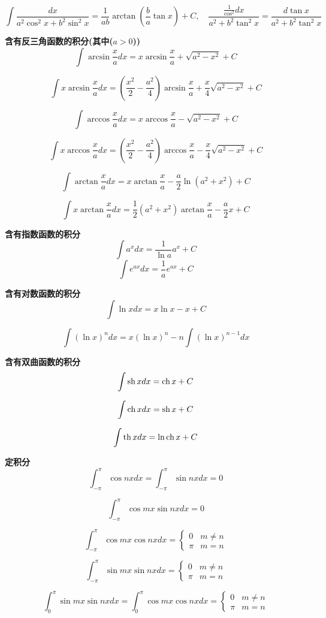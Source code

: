 \documentclass{book}
\begin{document}
$$
\int \frac{ dx}{a^2 \cos^2 x+b^2\sin^2 x}=\frac{ 1}{ab} \arctan(\frac{b}{a}\tan x)+C, \quad
\frac{\frac{1}{\cos^2}dx}{a^2+b^2\tan^2 x}=\frac{d \tan x}{a^2 + b^2 \tan^2 x}
$$

\textbf{含有反三角函数的积分(其中($a>0$))}
$$ \int \arcsin \frac{x}{a}dx=x\arcsin \frac{x}{a}+\sqrt{a^2-x^2}+C $$

$$ \int x\arcsin \frac{x}{a}dx=(\frac{x^2}{2}-\frac{ a^2}{4})\arcsin \frac{x}{a}+ \frac{x}{4}\sqrt{a^2-x^2}+C $$

$$ \int \arccos \frac{x}{a}dx=x \arccos \frac{x}{a}-\sqrt{a^2-x^2}+C $$

$$ \int x\arccos \frac{x}{a}dx=(\frac{x^2}{2}-\frac{ a^2}{4})\arccos \frac{x}{a}- \frac{x}{4}\sqrt{a^2-x^2}+C $$

$$ \int \arctan \frac{x}{a}dx=x \arctan \frac{x}{a}-\frac{a}{2}\ln(a^2+x^2)+C $$

$$ \int x \arctan \frac{x}{a}dx=\frac{1}{2}(a^2+x^2)\arctan \frac{x}{a}- \frac{a}{2}x+C $$

\textbf{含有指数函数的积分}
$$ \int a^xdx=\frac{1}{\ln a}a^x+C $$
$$ \int e^{ax}dx=\frac{ 1}{a}e^{ax}+C $$

\textbf{含有对数函数的积分}
$$ \int \ln xdx=x\ln x-x +C $$

$$ \int (\ln x)^n dx=x(\ln x)^n -n \int (\ln x)^{n-1}dx $$

\textbf{含有双曲函数的积分}
$$ \int \operatorname{sh} xdx=\operatorname{ch} x+C $$

$$ \int \operatorname{ch} xdx=\operatorname{sh} x+C $$

$$ \int \operatorname{th} xdx=\ln \operatorname{ch} x+C $$

\textbf{定积分}
$$
\int_{-\pi}^{\pi} \cos nx dx=
\int_{-\pi}^{\pi} \sin nx dx=0
$$

$$ \int_{-\pi}^{\pi} \cos mx\sin nx dx=0 $$

$$
\int_{-\pi}^{\pi} \cos mx\cos nx dx=
\left\{
		\begin{array}{ll}
		 0 & m \neq n \\
		 \pi & m = n
		\end{array}
		\right.
$$

$$
\int_{-\pi}^{\pi} \sin mx\sin nx dx=
\left\{
		\begin{array}{ll}
		 0 & m \neq n \\
		 \pi & m = n
		\end{array}
		\right.
$$

$$
\int_{0}^{\pi} \sin mx\sin nx dx=
\int_{0}^{\pi} \cos mx\cos nx dx=
\left\{
		\begin{array}{ll}
		 0 & m \neq n \\
		 \pi & m = n
		\end{array}
		\right.
$$
\end{document}
